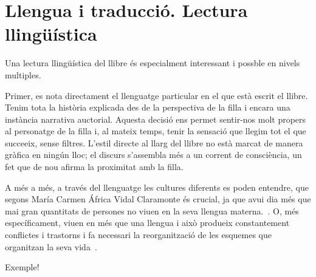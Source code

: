 \section{Llengua i traducció. Lectura llingüística}

Una lectura llingüística del llibre és especialment interessant i possble en nivels multiples.

Primer, es nota directament el llenguatge particular en el que està escrit el llibre.
Tenim tota la història explicada des de la perspectiva de la filla i encara una instància narrativa auctorial.
Aquesta decisió ens permet sentir-nos molt propers al personatge de la filla i, al mateix temps, tenir la sensació que llegim tot el que succeeix, sense filtres.
L'estil directe al llarg del llibre no està marcat de manera gràfica en ningún lloc; el discurs s'assembla més a un corrent de consciència, un fet que de nou afirma la proximitat amb la filla.


A més a més, a través del llenguatge les cultures diferents es poden entendre, que segons María Carmen África Vidal Claramonte és crucial, ja que avui dia més que mai gran quantitats de persones no viuen en la seva llengua materna.~\autocite{Vidal2012}.
O, més específicament, viuen en més que una llengua i això produeix constantement conflictes i trastorns i fa necessari la reorganització de les esquemes que organitzan la seva vida~\autocite{Albin2005}.

Exemple!


